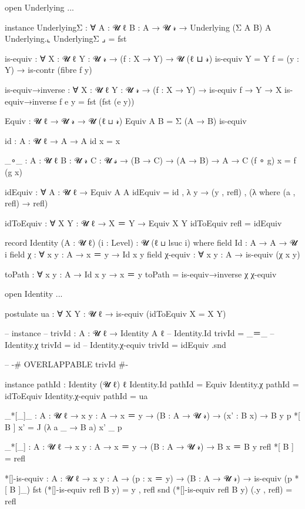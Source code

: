 \begin{code}
open Underlying {{...}}

instance
    UnderlyingΣ : ∀ {A : 𝓤 ℓ} {B : A → 𝓤 𝓇} → Underlying (Σ A B) A
    Underlying.⌞ UnderlyingΣ ⌟ = fst

is-equiv : ∀ {X : 𝓤 ℓ} {Y : 𝓤 𝓇} → (f : X → Y) → 𝓤 (ℓ ⊔ 𝓇)
is-equiv {Y = Y} f = (y : Y) → is-contr (fibre f y) 

is-equiv→inverse : ∀ {X : 𝓤 ℓ} {Y : 𝓤 𝓇} → (f : X → Y) → is-equiv f → Y → X
is-equiv→inverse f e y = fst (fst (e y))

Equiv : 𝓤 ℓ → 𝓤 𝓇 → 𝓤 (ℓ ⊔ 𝓇)
Equiv A B = Σ (A → B) is-equiv

id : {A : 𝓤 ℓ} → A → A
id x = x

_∘_ : {A : 𝓤 ℓ} {B : 𝓤 𝓇} {C : 𝓤 𝓈} → (B → C) → (A → B) → A → C
(f ∘ g) x = f (g x)



idEquiv : ∀ {A : 𝓤 ℓ} → Equiv A A
idEquiv = id , λ y → (y , refl) , (λ where (a , refl) → refl)

idToEquiv : ∀ {X Y : 𝓤 ℓ} → X ＝ Y → Equiv X Y
idToEquiv refl = idEquiv 

record Identity (A : 𝓤 ℓ) (i : Level) : 𝓤 (ℓ ⊔ lsuc i) where
    field Id       : A → A → 𝓤 i
    field χ : ∀ {x y : A} → x ＝ y → Id x y
    field χ-equiv : ∀ {x y : A} → is-equiv (χ {x} {y})

    toPath : ∀ {x y : A} → Id x y → x ＝ y
    toPath = is-equiv→inverse χ χ-equiv 
 
open Identity {{...}}

postulate
    ua : ∀ {X Y : 𝓤 ℓ} → is-equiv (idToEquiv {X = X} {Y})

-- instance
--     trivId : {A : 𝓤 ℓ} → Identity A ℓ
--     Identity.Id trivId = _＝_
--     Identity.χ trivId = id
--     Identity.χ-equiv trivId = idEquiv .snd

-- {-# OVERLAPPABLE trivId #-}

instance
    pathId : Identity (𝓤 ℓ) ℓ
    Identity.Id pathId = Equiv
    Identity.χ pathId = idToEquiv
    Identity.χ-equiv pathId = ua

_*[_]_ : {A : 𝓤 ℓ} → {x y : A} → x ＝ y → (B : A →  𝓤 𝓇) → (x' : B x) → B y
p *[ B ] x' = J (λ a _ → B a) x' _ p

_*[_] : {A : 𝓤 ℓ} → {x y : A} → x ＝ y → (B : A →  𝓤 𝓇) → B x ＝ B y
refl *[ B ] = refl

*[]-is-equiv : {A : 𝓤 ℓ} → {x y : A} → (p : x ＝ y) → (B : A →  𝓤 𝓇) → is-equiv (p *[ B ]_)
fst (*[]-is-equiv refl B y) = y , refl
snd (*[]-is-equiv refl B y) (.y , refl) = refl


\end{code}
